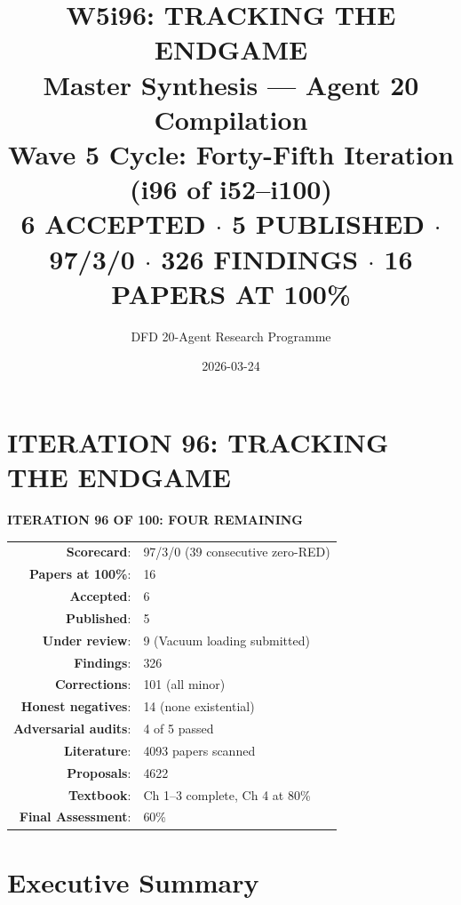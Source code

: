 \documentclass[11pt,a4paper]{article}
\title{\Huge W5i96: TRACKING THE ENDGAME\\[12pt]
\Large Master Synthesis --- Agent 20 Compilation\\[6pt]
\large Wave 5 Cycle: Forty-Fifth Iteration (i96 of i52--i100)\\[6pt]
\normalsize \textbf{6 ACCEPTED $\cdot$ 5 PUBLISHED $\cdot$ 97/3/0 $\cdot$ 326 FINDINGS $\cdot$ 16 PAPERS AT 100\%}}
\author{DFD 20-Agent Research Programme}
\date{2026-03-24}
\begin{document}
\maketitle

\section*{ITERATION 96: TRACKING THE ENDGAME}

\begin{tcolorbox}[colback=green!5!white, colframe=dfdgreen]
\begin{center}
\Large\textbf{ITERATION 96 OF 100: FOUR REMAINING}\\[12pt]

\begin{tabular}{rl}
\textbf{Scorecard}: & 97/3/0 (39 consecutive zero-RED) \\
\textbf{Papers at 100\%}: & 16 \\
\textbf{Accepted}: & 6 \\
\textbf{Published}: & 5 \\
\textbf{Under review}: & 9 (Vacuum loading submitted) \\
\textbf{Findings}: & 326 \\
\textbf{Corrections}: & 101 (all minor) \\
\textbf{Honest negatives}: & 14 (none existential) \\
\textbf{Adversarial audits}: & 4 of 5 passed \\
\textbf{Literature}: & 4093 papers scanned \\
\textbf{Proposals}: & 4622 \\
\textbf{Textbook}: & Ch 1--3 complete, Ch 4 at 80\% \\
\textbf{Final Assessment}: & 60\% \\
\end{tabular}
\end{center}
\end{tcolorbox}

\section{Executive Summary}
\end{document}
